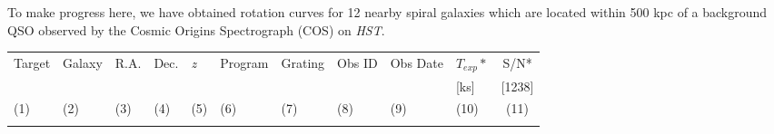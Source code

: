 \documentclass[iop]{emulateapj-rtx4}
\begin{document}
To make progress here, we have obtained rotation curves for 12 nearby spiral galaxies which are located within 500 kpc of a background QSO observed by the Cosmic Origins Spectrograph (COS) on \textit{HST}. 


\begin{table}[ht]\footnotesize
\begin{center}
\begin{tabular}{l l l l l l l l l l c}
 \hline \hline
  Target 		& Galaxy		& R.A. 		& Dec. 		& \textit{z}		 & Program 	  & Grating 	  & Obs ID 	    & Obs Date		& $T_{exp}*$	& S/N*  \\ 
  	    		& 	       		&	  		& 		  	 & 		    	  & 		  	  & 		  	   & 		     	    & 				& [ks]		& [1238] \\ 
 \scriptsize (1)  & \scriptsize (2) & \scriptsize (3) & \scriptsize (4) & \scriptsize (5) & \scriptsize (6) & \scriptsize  (7) & \scriptsize (8) & \scriptsize (9) 	& \scriptsize (10) & \scriptsize (11)  \\ \hline \hline
\\
    

\end{tabular}
\end{center}
\end{table}
\end{document}
